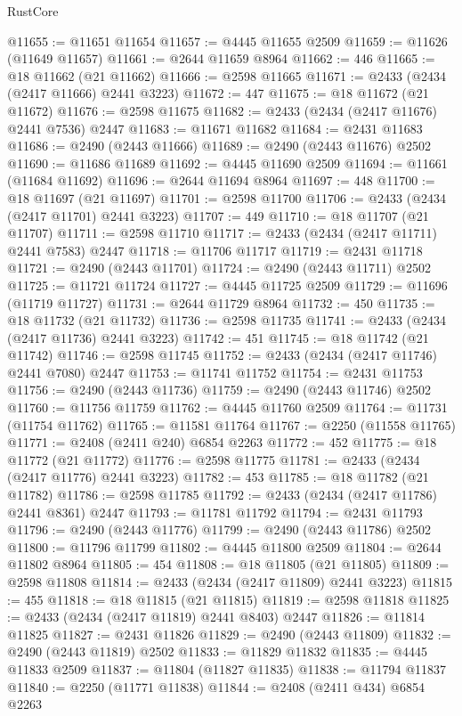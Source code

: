 \begin{lexlean}{RustCore}
\begin{coremodule}
@11655 := @11651 @11654
@11657 := @4445 @11655 @2509
@11659 := @11626 (@11649 @11657)
@11661 := @2644 @11659 @8964
@11662 := 446
@11665 := @18 @11662 (@21 @11662)
@11666 := @2598 @11665
@11671 := @2433 (@2434 (@2417 @11666) @2441 @3223)
@11672 := 447
@11675 := @18 @11672 (@21 @11672)
@11676 := @2598 @11675
@11682 := @2433 (@2434 (@2417 @11676) @2441 @7536) @2447
@11683 := @11671 @11682
@11684 := @2431 @11683
@11686 := @2490 (@2443 @11666)
@11689 := @2490 (@2443 @11676) @2502
@11690 := @11686 @11689
@11692 := @4445 @11690 @2509
@11694 := @11661 (@11684 @11692)
@11696 := @2644 @11694 @8964
@11697 := 448
@11700 := @18 @11697 (@21 @11697)
@11701 := @2598 @11700
@11706 := @2433 (@2434 (@2417 @11701) @2441 @3223)
@11707 := 449
@11710 := @18 @11707 (@21 @11707)
@11711 := @2598 @11710
@11717 := @2433 (@2434 (@2417 @11711) @2441 @7583) @2447
@11718 := @11706 @11717
@11719 := @2431 @11718
@11721 := @2490 (@2443 @11701)
@11724 := @2490 (@2443 @11711) @2502
@11725 := @11721 @11724
@11727 := @4445 @11725 @2509
@11729 := @11696 (@11719 @11727)
@11731 := @2644 @11729 @8964
@11732 := 450
@11735 := @18 @11732 (@21 @11732)
@11736 := @2598 @11735
@11741 := @2433 (@2434 (@2417 @11736) @2441 @3223)
@11742 := 451
@11745 := @18 @11742 (@21 @11742)
@11746 := @2598 @11745
@11752 := @2433 (@2434 (@2417 @11746) @2441 @7080) @2447
@11753 := @11741 @11752
@11754 := @2431 @11753
@11756 := @2490 (@2443 @11736)
@11759 := @2490 (@2443 @11746) @2502
@11760 := @11756 @11759
@11762 := @4445 @11760 @2509
@11764 := @11731 (@11754 @11762)
@11765 := @11581 @11764
@11767 := @2250 (@11558 @11765)
@11771 := @2408 (@2411 @240) @6854 @2263
@11772 := 452
@11775 := @18 @11772 (@21 @11772)
@11776 := @2598 @11775
@11781 := @2433 (@2434 (@2417 @11776) @2441 @3223)
@11782 := 453
@11785 := @18 @11782 (@21 @11782)
@11786 := @2598 @11785
@11792 := @2433 (@2434 (@2417 @11786) @2441 @8361) @2447
@11793 := @11781 @11792
@11794 := @2431 @11793
@11796 := @2490 (@2443 @11776)
@11799 := @2490 (@2443 @11786) @2502
@11800 := @11796 @11799
@11802 := @4445 @11800 @2509
@11804 := @2644 @11802 @8964
@11805 := 454
@11808 := @18 @11805 (@21 @11805)
@11809 := @2598 @11808
@11814 := @2433 (@2434 (@2417 @11809) @2441 @3223)
@11815 := 455
@11818 := @18 @11815 (@21 @11815)
@11819 := @2598 @11818
@11825 := @2433 (@2434 (@2417 @11819) @2441 @8403) @2447
@11826 := @11814 @11825
@11827 := @2431 @11826
@11829 := @2490 (@2443 @11809)
@11832 := @2490 (@2443 @11819) @2502
@11833 := @11829 @11832
@11835 := @4445 @11833 @2509
@11837 := @11804 (@11827 @11835)
@11838 := @11794 @11837
@11840 := @2250 (@11771 @11838)
@11844 := @2408 (@2411 @434) @6854 @2263

\end{coremodule}
\end{lexlean}
